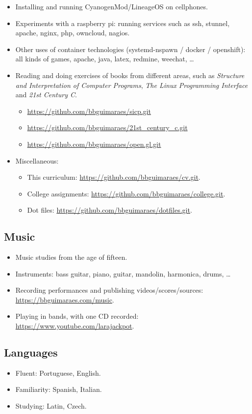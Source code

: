 \begin{itemize}[noitemsep]
    \item Installing and running CyanogenMod/LineageOS on cellphones.
    \item
        Experiments with a raspberry pi: running services such as ssh, stunnel,
        apache, nginx, php, owncloud, nagios.
    \item
        Other uses of container technologies (systemd-nspawn / docker /
        openshift): all kinds of games, apache, java, latex, redmine, weechat,
        …
    \item
        Reading and doing exercises of books from different areas, such as
        \textit{Structure and Interpretation of Computer Programs}, \textit{The
        Linux Programming Interface} and \textit{21st Century C}.
        \begin{itemize}[noitemsep]
            \item \url{https://github.com/bbguimaraes/sicp.git}
            \item \url{https://github.com/bbguimaraes/21st_century_c.git}
            \item \url{https://github.com/bbguimaraes/open.gl.git}
        \end{itemize}
    \item Miscellaneous:
        \begin{itemize}[noitemsep]
            \item
                This curriculum:
                \url{https://github.com/bbguimaraes/cv.git}.
            \item
                College assignments:
                \url{https://github.com/bbguimaraes/college.git}.
            \item
                Dot files:
                \url{https://github.com/bbguimaraes/dotfiles.git}.
        \end{itemize}
\end{itemize}

\subsection*{Music}

\begin{itemize}[noitemsep]
    \item Music studies from the age of fifteen.
    \item
        Instruments: bass guitar, piano, guitar, mandolin, harmonica, drums, …
    \item
        Recording performances and publishing videos/scores/sources:
        \url{https://bbguimaraes.com/music}.
    \item
        Playing in bands, with one CD recorded:
        \url{https://www.youtube.com/larajackpot}.
\end{itemize}

\subsection*{Languages}

\begin{itemize}[noitemsep]
    \item Fluent: Portuguese, English.
    \item Familiarity: Spanish, Italian.
    \item Studying: Latin, Czech.
\end{itemize}
